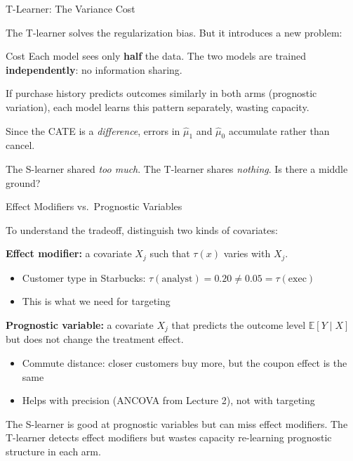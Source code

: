 \documentclass[aspectratio=169, 11pt]{beamer}
\newcommand{\E}{\mathbb{E}}
\begin{document}
\begin{frame}{T-Learner: The Variance Cost}
 
The T-learner solves the regularization bias. But it introduces a new problem:
 
\bigskip
 
\begin{alertblock}{Cost}
Each model sees only \textbf{half} the data. The two models are trained \textbf{independently}: no information sharing.
\end{alertblock}
 
\bigskip
 
If purchase history predicts outcomes similarly in both arms (prognostic variation), each model learns this pattern separately, wasting capacity.
 
\bigskip
 
Since the CATE is a \emph{difference}, errors in $\hat{\mu}_1$ and $\hat{\mu}_0$ accumulate rather than cancel.
 
\bigskip
\pause
 
The S-learner shared \emph{too much}. The T-learner shares \emph{nothing}. Is there a middle ground?
\end{frame}
 
\begin{frame}{Effect Modifiers vs.\ Prognostic Variables}
 
To understand the tradeoff, distinguish two kinds of covariates:
 
\bigskip
 
\textbf{Effect modifier:} a covariate $X_j$ such that $\tau(x)$ varies with $X_j$.
\begin{itemize}
    \item Customer type in Starbucks: $\tau(\text{analyst}) = 0.20 \neq 0.05 = \tau(\text{exec})$
    \item This is what we need for targeting
\end{itemize}
 
\bigskip
 
\textbf{Prognostic variable:} a covariate $X_j$ that predicts the outcome level $\E[Y \mid X]$ but does not change the treatment effect.
\begin{itemize}
    \item Commute distance: closer customers buy more, but the coupon effect is the same
    \item Helps with precision (ANCOVA from Lecture 2), not with targeting
\end{itemize}
 
\bigskip
 
The S-learner is good at prognostic variables but can miss effect modifiers. The T-learner detects effect modifiers but wastes capacity re-learning prognostic structure in each arm.
\end{frame}
 
\end{document}
